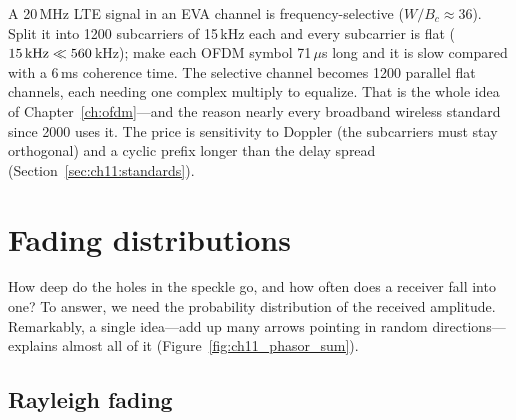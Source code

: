 
\begin{keyidea}
A 20\,MHz LTE signal in an EVA channel is frequency-selective ($W/B_c\approx36$). Split it into
1200 subcarriers of 15\,kHz each and every subcarrier is flat ($15\text{\,kHz}\ll560$\,kHz); make
each OFDM symbol 71\,$\mu$s long and it is slow compared with a 6\,ms coherence time. The
selective channel becomes 1200 parallel flat channels, each needing one complex multiply to
equalize. That is the whole idea of Chapter~\ref{ch:ofdm}---and the reason nearly every
broadband wireless standard since 2000 uses it. The price is sensitivity to Doppler (the
subcarriers must stay orthogonal) and a cyclic prefix longer than the delay spread
(Section~\ref{sec:ch11:standards}).
\end{keyidea}

\section{Fading distributions}
\label{sec:ch11:distributions}

How deep do the holes in the speckle go, and how often does a receiver fall into one? To answer,
we need the probability distribution of the received amplitude. Remarkably, a single idea---add
up many arrows pointing in random directions---explains almost all of it
(Figure~\ref{fig:ch11_phasor_sum}).


\subsection{Rayleigh fading}

